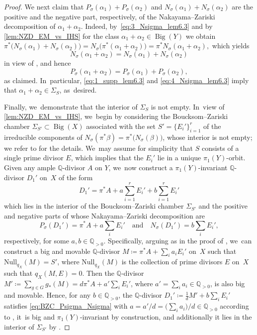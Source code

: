 \documentclass[JEP,XML,SOM,Unicode,published]{cedram}
\theoremstyle{plain}
\theoremstyle{definition}
\newcommand{\Q}{\mathbb{Q}}
\DeclareMathOperator{\BgCn}{\mathrm{Big}}
\begin{document}
\begin{proof}
We next claim that $P_\sigma(\alpha_1) + P_\sigma(\alpha_2)$ and $ N_\sigma(\alpha_1) + N_\sigma(\alpha_2)$ are the positive and the negative part, respectively, of the Nakayama--Zariski decomposition of $\alpha_1 + \alpha_2$. Indeed, by~\eqref{eq:3_Nsigma_lem6.3} and by \autoref{lem:NZD_EM_vs_IHS} for the class $\alpha_1 + \alpha_2 \in \BgCn(Y)$ we obtain
$\pi^* \bigl(N_\sigma(\alpha_1) + N_\sigma(\alpha_2) \bigr)
= N_\sigma \bigl(\pi^* (\alpha_1 + \alpha_2) \bigr)
= \pi^* N_\sigma (\alpha_1 + \alpha_2), $
which yields
\begin{equation}
\label{eq:4_Nsigma_lem6.3}
N_\sigma (\alpha_1 + \alpha_2) = N_\sigma(\alpha_1) + N_\sigma(\alpha_2)
\end{equation}
in view of \cite[Ch.\,7, Th.\,2.18]{Liu02book}, and hence
\[
P_\sigma (\alpha_1 + \alpha_2) = P_\sigma(\alpha_1) + P_\sigma(\alpha_2),
\]
as claimed. In~particular, \eqref{eq:1_supp_lem6.3} and \eqref{eq:4_Nsigma_lem6.3} imply that $\alpha_1 + \alpha_2 \in \Sigma_S$, as~desired.

Finally, we~demonstrate that the interior of $\Sigma_S$ is not empty. In~view of \autoref{lem:NZD_EM_vs_IHS}, we~begin by considering the Boucksom--Zariski chamber $\Sigma_{S'} \subset \BgCn(X)$ associated with the set $S' = \{ E_i' \}_{i=1}^r$ of the irreducible components of $N_\sigma(\pi^*\beta) = \pi^* \bigl(N_{\sigma}(\beta) \bigr)$, whose interior is not empty; we refer to \cite[\S 4]{Denisi23} for the details. We~may assume for simplicity that $S$ consists of a single prime divisor $E$, which implies that the $E_i'$ lie in a unique $\pi_1(Y)$-orbit. Given any ample $\Q$\nobreakdash-divisor $A$ on $Y$, we~now construct a $\pi_1(Y)$-invariant $\Q$\nobreakdash-divisor $D_1'$ on~$X$ of the form
\begin{equation}
\label{eq:BZC_int_divisor}
D_1' = \pi^*A + a\sum_{i=1}^r E_i' + b\sum_{i=1}^r E_i'
\end{equation}
which lies in the interior of the Boucksom--Zariski chamber $\Sigma_{S'}$ and the positive and negative parts of whose Nakayama--Zariski decomposition are
\begin{equation}
\label{eq:BZC_Psigma_Nsigma}
P_\sigma(D_1') = \pi^*A + a\sum_i E_i' \quad \text{and} \quad N_\sigma(D_1') = b\sum_i E_i',
\end{equation}
respectively, for some $a, b \in \Q_{>0}$. Specifically, arguing as in the proof of \cite[Lem.\,4.15]{Denisi23}, we~can construct a big and movable $\Q$\nobreakdash-divisor $M \coloneqq \pi^*A + \sum_i a_i E_i'$ on~$X$ such that $\mathrm{Null}_{q_X}(M)=S'$, where $\mathrm{Null}_{q_X}(M)$ is the collection of prime divisors $E$ on~$X$ such that $q_X(M,E)=0$. Then the $\Q$\nobreakdash-divisor $M' \coloneqq \sum_{g\in G} g_*(M) = d \pi^*A + a' \sum_i E_i' $, where $a' = \sum_i a_i \in \Q_{>0}$, is also big and movable. Hence, for any $b \in \Q_{>0}$, the $\Q$\nobreakdash-divisor $D_1' \coloneqq \frac{1}{d}M' + b \sum_i E_i'$ satisfies \eqref{eq:BZC_Psigma_Nsigma} with $a = a' / d = \bigl(\sum_i a_i \bigr) / d \in \Q_{>0}$ according to \cite[Rem.\,4.20]{Denisi23}, it~is big and $\pi_1(Y)$-invariant by construction, and additionally it lies in the interior of $\Sigma_{S'}$ by \cite[Cor.\,4.19]{Denisi23}.


\end{proof}
\end{document}

